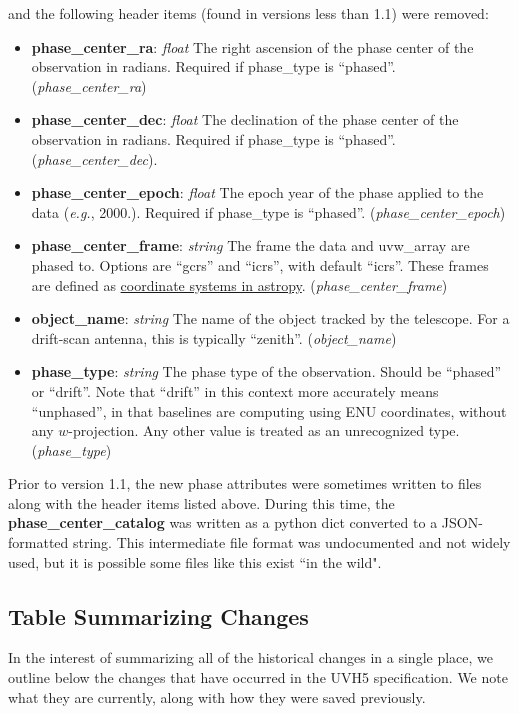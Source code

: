 \documentclass[11pt, oneside]{article}
\begin{document}
and the following header items (found in versions less than 1.1) were removed:

\begin{itemize}
    \item \textbf{phase\_center\_ra}: \textit{float} The right ascension of the
      phase center of the observation in radians. Required if phase\_type is
      ``phased''. (\textit{phase\_center\_ra})
    \item \textbf{phase\_center\_dec}: \textit{float} The declination of the phase
      center of the observation in radians. Required if phase\_type is
      ``phased''. (\textit{phase\_center\_dec}).
    \item \textbf{phase\_center\_epoch}: \textit{float} The epoch year of the phase
      applied to the data (\textit{e.g.}, 2000.). Required if phase\_type is
      ``phased''. (\textit{phase\_center\_epoch})
    \item \textbf{phase\_center\_frame}: \textit{string} The frame the data and
      uvw\_array are phased to. Options are ``gcrs'' and ``icrs'', with default
      ``icrs''. These frames are defined as
      \href{https://docs.astropy.org/en/stable/coordinates/index.html}{coordinate
        systems in astropy}. (\textit{phase\_center\_frame})
    \item \textbf{object\_name}: \textit{string} The name of the object tracked by
      the telescope. For a drift-scan antenna, this is typically
      ``zenith''. (\textit{object\_name})
    \item \textbf{phase\_type}: \textit{string} The phase type of the
      observation. Should be ``phased'' or ``drift''. Note that ``drift'' in this
      context more accurately means ``unphased'', in that baselines are computing
      using ENU coordinates, without any $w$-projection. Any other value is treated as
      an unrecognized type. (\textit{phase\_type})
\end{itemize}

Prior to version 1.1, the new phase attributes were sometimes written to files along with the
header items listed above. During this time, the \textbf{phase\_center\_catalog} was written
as a python dict converted to a JSON-formatted string. This intermediate file format was
undocumented and not widely used, but it is possible some files like this exist ``in the wild".

\subsection{Table Summarizing Changes}
\label{sec:version_table}
In the interest of summarizing all of the historical changes in a single place,
we outline below the changes that have occurred in the UVH5 specification. We
note what they are currently, along with how they were saved
previously.
\end{document}
